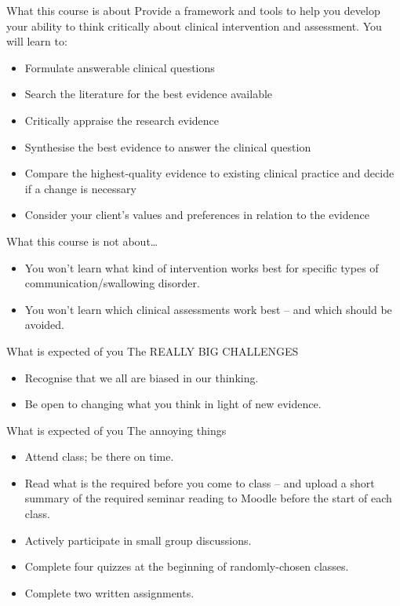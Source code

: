 \documentclass{beamer}
\begin{document}
\begin{frame}{What this course is about}
Provide a framework and tools to help you develop your ability to think critically about clinical intervention and assessment. You will learn to: \\
	\begin{itemize}
	\item Formulate answerable clinical questions
	\item Search the literature for the best evidence available
	\item Critically appraise the research evidence
	\item Synthesise the best evidence to answer the clinical question
	\item Compare the highest-quality evidence to existing clinical practice and decide if a change is necessary
	\item Consider your client's values and preferences in relation to the evidence
	\end{itemize}
\end{frame}

\begin{frame}{What this course is not about\dots}
	\begin{itemize}
	\item You won't learn what kind of intervention works best for specific types of communication/swallowing disorder.
	\item You won't learn which clinical assessments work best -- and which should be avoided.
	\end{itemize} 
\end{frame}

\begin{frame}{What is expected of you}
The REALLY BIG CHALLENGES \\
	\begin{itemize}
	\item Recognise that we all are biased in our thinking.
	\item Be open to changing what you think in light of new evidence.
	\end{itemize}
\end{frame}

\begin{frame}{What is expected of you}
The annoying things
	\begin{itemize}
	\item Attend class; be there on time.
	\item Read what is the required \alert{before} you come to class -- and upload a short summary of the required seminar reading to Moodle \alert{before} the start of each class.
	\item Actively participate in small group discussions.
	\item Complete four quizzes at the beginning of randomly-chosen classes.
	\item Complete two written assignments.
	\end{itemize}
\end{frame}
\end{document}
